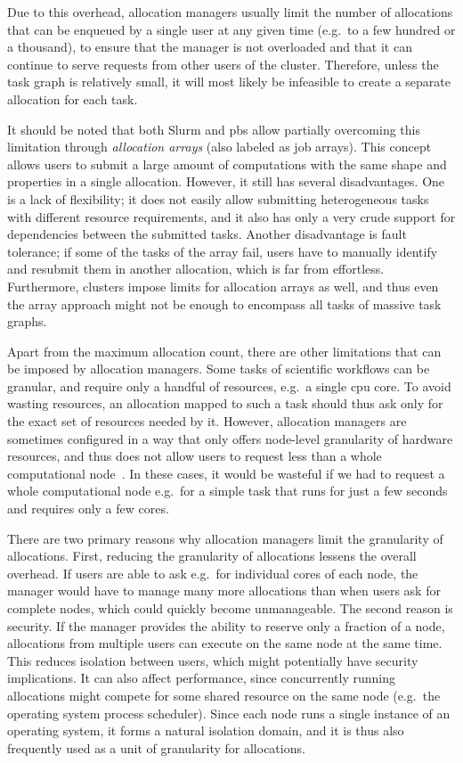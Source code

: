 Due to this overhead, allocation managers usually limit the number of allocations that can be
enqueued by a single user at any given time (e.g.\ to a few hundred or a thousand), to ensure that
the manager is not overloaded and that it can continue to serve requests from other users of the
cluster. Therefore, unless the task graph is relatively small, it will most likely be infeasible to
create a separate allocation for each task.

It should be noted that both Slurm and \gls{pbs} allow partially overcoming this
limitation through \emph{allocation arrays} (also labeled as job arrays). This concept allows users to submit a large amount of
computations with the same shape and properties in a single allocation. However, it still has
several disadvantages. One is a lack of flexibility; it does not easily allow submitting
heterogeneous tasks with different resource requirements, and it also has only a very crude support
for dependencies between the submitted tasks. Another disadvantage is fault tolerance; if some of
the tasks of the array fail, users have to manually identify and resubmit them in another
allocation, which is far from effortless. Furthermore, clusters impose limits for allocation arrays
as well, and thus even the array approach might not be enough to encompass all tasks of massive
task graphs.

Apart from the maximum allocation count, there are other limitations that can be imposed by
allocation managers. Some tasks of scientific workflows can be granular, and require only a handful
of resources, e.g.\ a single \gls{cpu} core. To avoid wasting resources, an
allocation mapped to such a task should thus ask only for the exact set of resources needed by it.
However, allocation managers are sometimes configured in a way that only offers node-level
granularity of hardware resources, and thus does not allow users to request less than a whole
computational node~\cite{it4i_node_scheduling_policy}. In these cases, it would be wasteful if we had to
request a whole computational node e.g.\ for a simple task that runs for just a few seconds and
requires only a few cores.

There are two primary reasons why allocation managers limit the granularity of allocations. First,
reducing the granularity of allocations lessens the overall overhead. If users are able to ask
e.g.\ for individual cores of each node, the manager would have to manage many more allocations
than when users ask for complete nodes, which could quickly become unmanageable. The second reason
is security. If the manager provides the ability to reserve only a fraction of a node, allocations
from multiple users can execute on the same node at the same time. This reduces isolation between
users, which might potentially have security implications. It can also affect performance, since
concurrently running allocations might compete for some shared resource on the same node (e.g.\ the
operating system process scheduler). Since each node runs a single instance of an operating system,
it forms a natural isolation domain, and it is thus also frequently used as a unit of granularity
for allocations.

